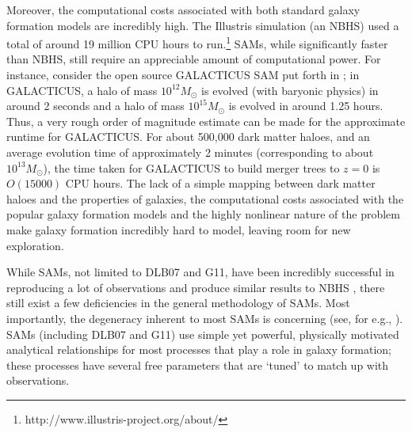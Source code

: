 \documentclass[a4paper,fleqn,usenatbib]{mnras}
\begin{document}
\par Moreover, the computational costs associated with both standard galaxy formation models are incredibly high. The Illustris simulation (an NBHS) used a total of around 19 million CPU hours to run.\footnote{http://www.illustris-project.org/about/} SAMs, while significantly faster than NBHS, still require an appreciable amount of computational power. For instance, consider the open source GALACTICUS SAM put forth in \citet{benson2012galacticus}; in GALACTICUS, a halo of mass $10^{12} M_{\odot}$ is evolved (with baryonic physics) in around 2 seconds and a halo of mass $10^{15} M_{\odot}$ is evolved in around 1.25 hours. Thus, a very rough order of magnitude estimate can be made for the approximate runtime for GALACTICUS. For about 500,000 dark matter haloes, and an average evolution time of approximately 2 minutes (corresponding to about $10^{13} M_{\odot}$), the time taken for GALACTICUS to build merger trees to $z=0$ is $O(15000)$ CPU hours. The lack of a simple mapping between dark matter haloes and the properties of galaxies, the computational costs associated with the popular galaxy formation models and the highly nonlinear nature of the problem make galaxy formation incredibly hard to model, leaving room for new exploration.

\par 
While SAMs, not limited to DLB07 and G11, have been incredibly successful in reproducing a lot of observations \citep{white1991galaxy, kauffmann1993formation, cole1994recipe, somerville1999semi, cole2000hierarchical, kang2005semianalytical, bower2006breaking, de2007hierarchical, somerville2008semi, weinmann2010cluster, de2011comparison} and produce similar results to NBHS \citep{benson2001comparison, somerville2014physical}, there still exist a few deficiencies in the general methodology of SAMs. Most importantly, the degeneracy inherent to most SAMs is concerning (see, for e.g., \citet{henriques2009monte, bower2010parameter, neistein2010degeneracy}). SAMs (including DLB07 and G11) use simple yet powerful, physically motivated analytical relationships for most processes that play a role in galaxy formation; these processes have several free parameters that are `tuned' to match up with observations. 
\end{document}

